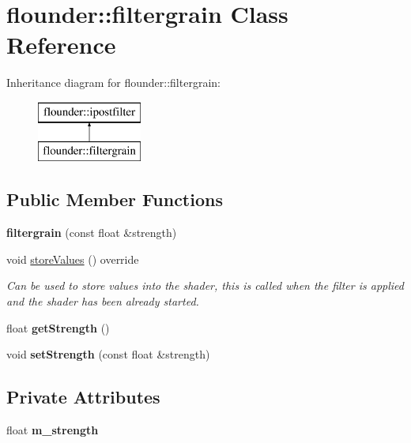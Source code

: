 \hypertarget{classflounder_1_1filtergrain}{}\section{flounder\+:\+:filtergrain Class Reference}
\label{classflounder_1_1filtergrain}
Inheritance diagram for flounder\+:\+:filtergrain\+:\begin{figure}[H]
\begin{center}
\leavevmode
\includegraphics[height=2.000000cm]{classflounder_1_1filtergrain}
\end{center}
\end{figure}
\subsection*{Public Member Functions}
\begin{DoxyCompactItemize}
\item 
\mbox{\label{classflounder_1_1filtergrain_aea807307ca6342c08b8a301ea2dd00c0}} 
{\bfseries filtergrain} (const float \&strength)
\item 
void \hyperlink{classflounder_1_1filtergrain_a0f65f9e8b994f18a4777e4451bdf8b4e}{store\+Values} () override
\begin{DoxyCompactList}\small\item\em Can be used to store values into the shader, this is called when the filter is applied and the shader has been already started. \end{DoxyCompactList}\item 
\mbox{\label{classflounder_1_1filtergrain_a6d0cc4aed59190316cb51ee163f4d644}} 
float {\bfseries get\+Strength} ()
\item 
\mbox{\label{classflounder_1_1filtergrain_ac6f764272481963353642bd7b3d4f746}} 
void {\bfseries set\+Strength} (const float \&strength)
\end{DoxyCompactItemize}
\subsection*{Private Attributes}
\begin{DoxyCompactItemize}
\item 
\mbox{\label{classflounder_1_1filtergrain_a038e33f9dd08809f8242d67336ad4483}} 
float {\bfseries m\+\_\+strength}
\end{DoxyCompactItemize}
